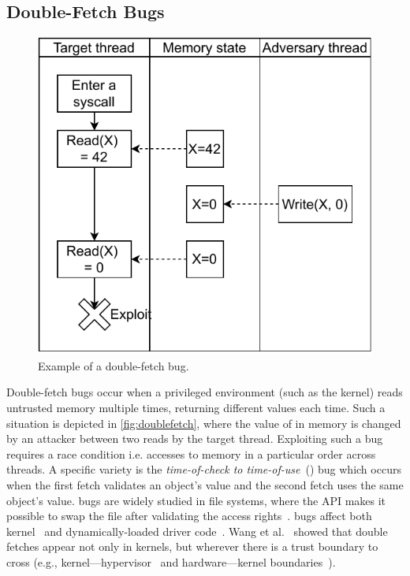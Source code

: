 \documentclass[letterpaper,twocolumn,10pt]{article}
\begin{document}
\subsection{Double-Fetch Bugs}

\begin{figure}[]
  \centering
  \includegraphics[width=.85\linewidth]{img/doublefetch.pdf}
  \caption{Example of a double-fetch bug.}
  \label{fig:doublefetch}
\end{figure}

Double-fetch bugs occur when a privileged environment (such as the kernel)
reads untrusted memory multiple times, returning different values each time.
Such a situation is depicted in \autoref{fig:doublefetch}, 
where the value of  in memory is changed by an attacker
between two reads by the target thread.
Exploiting such a bug requires a race condition i.e. accesses 
to memory in a particular order across threads.
A specific variety is the \emph{time-of-check to time-of-use}~(\tocttou) 
bug which occurs when the first fetch validates an object's value and
the second fetch uses the same object's value.
\tocttou bugs are widely studied in file systems, where the
API makes it possible to swap the file after validating the access
rights~\cite{payer2012protecting,
pu2006methodical, wei2010modeling, tsafrir2008portably,Garfinkel03}.
\tocttou bugs affect both kernel~\cite{jurczyk2013bochspwn, wang2018survey}
and dynamically-loaded driver code~\cite{cve201812633,cve201812633fix}.
Wang et al.~\cite{wang2018survey} showed that double fetches appear not only
in kernels, but wherever there is a trust boundary to cross (e.g.,
kernel---hypervisor~\cite{wilhelm2016xenpwn} and hardware---kernel
boundaries~\cite{lu2018untrusted}).
\end{document}
